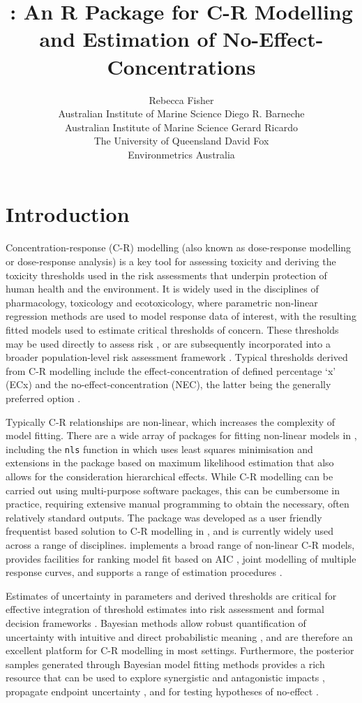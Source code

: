 \documentclass[
]{jss}
\author{
Rebecca Fisher\\Australian Institute of Marine Science \And Diego R.
Barneche\\Australian Institute of Marine Science \AND Gerard
Ricardo\\The University of Queensland \And David Fox\\Environmetrics
Australia
}
\title{\pkg{bayesnec}: An R Package for C-R Modelling and Estimation of
No-Effect-Concentrations}
\begin{document}
\hypertarget{introduction}{%
\section{Introduction}\label{introduction}}

Concentration-response (C-R) modelling (also known as dose-response
modelling or dose-response analysis) is a key tool for assessing
toxicity and deriving the toxicity thresholds used in the risk
assessments that underpin protection of human health and the
environment. It is widely used in the disciplines of pharmacology,
toxicology and ecotoxicology, where parametric non-linear regression
methods are used to model response data of interest, with the resulting
fitted models used to estimate critical thresholds of concern. These
thresholds may be used directly to assess risk \citep[e.g
see][]{fisher2018c}, or are subsequently incorporated into a broader
population-level risk assessment framework \citep[e.g.][]{Warne2015}.
Typical thresholds derived from C-R modelling include the
effect-concentration of defined percentage `x' (ECx) and the
no-effect-concentration (NEC), the latter being the generally preferred
option \citep{Fox2008, Warne2015}.

Typically C-R relationships are non-linear, which increases the
complexity of model fitting. There are a wide array of packages for
fitting non-linear models in , including the \texttt{nls}
function in  which uses least squares minimisation and
extensions in the  package \citep{pinheiro2021} based on
maximum likelihood estimation that also allows for the consideration
hierarchical effects. While C-R modelling can be carried out using
multi-purpose software packages, this can be cumbersome in practice,
requiring extensive manual programming to obtain the necessary, often
relatively standard outputs. The  package \citep{Ritz2016} was
developed as a user friendly frequentist based solution to C-R modelling
in , and is currently widely used across a range of
disciplines.  implements a broad range of non-linear C-R
models, provides facilities for ranking model fit based on AIC
\citep{Burnham2002}, joint modelling of multiple response curves, and
supports a range of estimation procedures \citep{Ritz2016}.

Estimates of uncertainty in parameters and derived thresholds are
critical for effective integration of threshold estimates into risk
assessment and formal decision frameworks \citep{fisher2018c}. Bayesian
methods allow robust quantification of uncertainty with intuitive and
direct probabilistic meaning \citep{Ellison1996}, and are therefore an
excellent platform for C-R modelling in most settings. Furthermore, the
posterior samples generated through Bayesian model fitting methods
provides a rich resource that can be used to explore synergistic and
antagonistic impacts \citep{Fisher2019d, flores2021}, propagate endpoint
uncertainty \citep{Charles2020a, Gottschalk2013}, and for testing
hypotheses of no-effect \citep{Thomas2006}.
\end{document}
